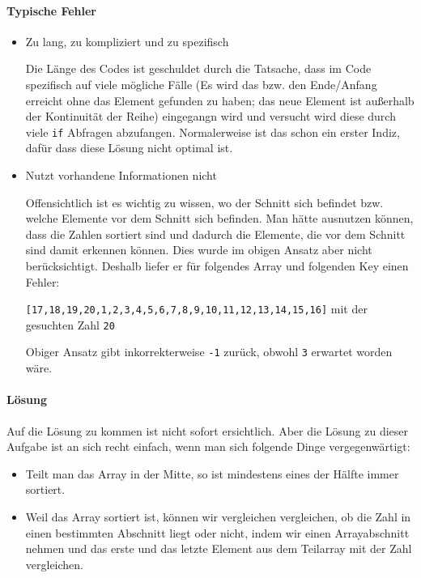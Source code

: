 \documentclass{book}
\begin{document}
\paragraph{Typische Fehler}
\begin{itemize} 
	\item Zu lang, zu kompliziert und zu spezifisch
	
	Die Länge des Codes ist geschuldet durch die Tatsache, dass im Code spezifisch auf viele mögliche Fälle (Es wird das bzw. den Ende/Anfang erreicht ohne das Element gefunden zu haben; das neue Element ist außerhalb der Kontinuität der Reihe) eingegangn wird und versucht wird diese durch viele \lstinline|if| Abfragen abzufangen. Normalerweise ist das schon ein erster Indiz, dafür dass diese Lösung nicht optimal ist. 
	
	\item Nutzt vorhandene Informationen nicht
	
	Offensichtlich ist es wichtig zu wissen, wo der Schnitt sich befindet bzw. welche Elemente vor dem Schnitt sich befinden. Man hätte ausnutzen können, dass die Zahlen sortiert sind und dadurch die Elemente, die vor dem Schnitt sind damit erkennen können. Dies wurde im obigen Ansatz aber nicht berücksichtigt. Deshalb liefer er für folgendes Array und folgenden Key einen Fehler:
	
	 \lstinline|[17,18,19,20,1,2,3,4,5,6,7,8,9,10,11,12,13,14,15,16]| mit der gesuchten Zahl \lstinline|20|
	 
	 Obiger Ansatz gibt inkorrekterweise \lstinline|-1| zurück, obwohl \lstinline|3| erwartet worden wäre.
	
\end{itemize}
\paragraph{Lösung} Auf die Lösung zu kommen ist nicht sofort ersichtlich. Aber die Lösung zu dieser Aufgabe ist an sich recht einfach, wenn man sich folgende Dinge vergegenwärtigt:

\begin{itemize} 
	\item Teilt man das Array in der Mitte, so ist mindestens eines der Hälfte immer sortiert.
	
	\item Weil das Array sortiert ist, können wir vergleichen vergleichen, ob die Zahl in einen bestimmten Abschnitt liegt oder nicht, indem wir einen Arrayabschnitt nehmen und das erste und das letzte Element aus dem Teilarray mit der Zahl vergleichen.
\end{itemize}
\end{document}

